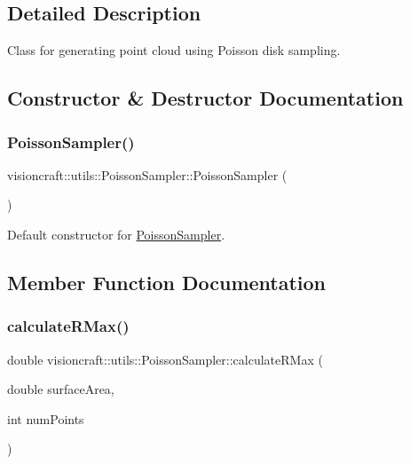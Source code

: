 \subsection{Detailed Description}
Class for generating point cloud using Poisson disk sampling. 

\subsection{Constructor \& Destructor Documentation}
\mbox{\label{classvisioncraft_1_1utils_1_1PoissonSampler_a7bfb01ef24d01f16e51a0c6533db300a}} 
\subsubsection{\texorpdfstring{Poisson\+Sampler()}{PoissonSampler()}}
{\footnotesize\ttfamily visioncraft\+::utils\+::\+Poisson\+Sampler\+::\+Poisson\+Sampler (\begin{DoxyParamCaption}{ }\end{DoxyParamCaption})}



Default constructor for \hyperlink{classvisioncraft_1_1utils_1_1PoissonSampler}{Poisson\+Sampler}. 



\subsection{Member Function Documentation}
\mbox{\label{classvisioncraft_1_1utils_1_1PoissonSampler_ac3afe76a33d3ba2f0dfb709b92c6608d}} 
\subsubsection{\texorpdfstring{calculate\+R\+Max()}{calculateRMax()}}
{\footnotesize\ttfamily double visioncraft\+::utils\+::\+Poisson\+Sampler\+::calculate\+R\+Max (\begin{DoxyParamCaption}\item[{double}]{surface\+Area,  }\item[{int}]{num\+Points }\end{DoxyParamCaption})}



